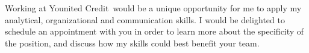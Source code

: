 \documentclass[11pt, a4paper]{awesome-cv}
\newcommand{\company}{Younited Credit}
\begin{document}
\begin{cvletter}
Working at \company~would be a unique opportunity for me to apply my analytical, organizational and communication skills.  
I would be delighted to schedule an appointment with you in order to learn more about the specificity of the position, and discuss how my skills could best benefit your team. 
\end{cvletter}


\makeletterclosing
\end{document}
